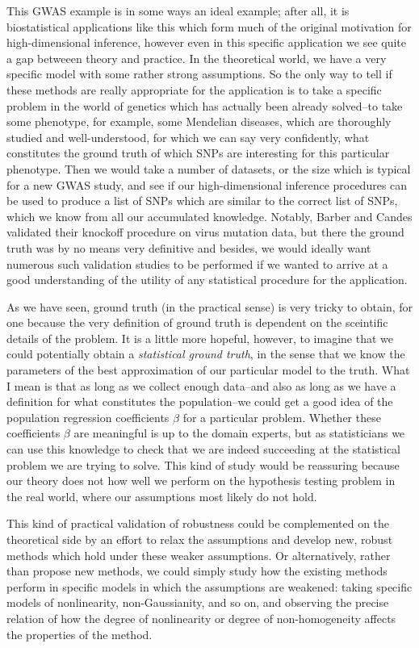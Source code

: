 \documentclass[11pt]{article}
\begin{document}
This GWAS example is in some ways an ideal example; after all, it is
biostatistical applications like this which form much of the original
motivation for high-dimensional inference, however even in this
specific application we see quite a gap betweeen theory and practice.
In the theoretical world, we have a very specific model with some
rather strong assumptions.  So the only way to tell if these methods
are really appropriate for the application is to take a specific
problem in the world of genetics which has actually been already
solved--to take some phenotype, for example, some Mendelian diseases,
which are thoroughly studied and well-understood, for which we can say
very confidently, what constitutes the ground truth of which SNPs are
interesting for this particular phenotype.  Then we would take a
number of datasets, or the size which is typical for a new GWAS study,
and see if our high-dimensional inference procedures can be used to
produce a list of SNPs which are similar to the correct list of SNPs,
which we know from all our accumulated knowledge.  Notably, Barber and
Candes validated their knockoff procedure on virus mutation data, but
there the ground truth was by no means very definitive and besides, we
would ideally want numerous such validation studies to be performed if
we wanted to arrive at a good understanding of the utility of any
statistical procedure for the application.

As we have seen, ground truth (in the practical sense) is very tricky
to obtain, for one because the very definition of ground truth is
dependent on the sceintific details of the problem.  It is a little
more hopeful, however, to imagine that we could potentially obtain a
\emph{statistical ground truth}, in the sense that we know the
parameters of the best approximation of our particular model to the
truth.  What I mean is that as long as we collect enough data--and
also as long as we have a definition for what constitutes the
population--we could get a good idea of the population regression
coefficients $\beta$ for a particular problem.  Whether these
coefficients $\beta$ are meaningful is up to the domain experts, but
as statisticians we can use this knowledge to check that we are indeed
succeeding at the statistical problem we are trying to solve.  This
kind of study would be reassuring because our theory does not how well
we perform on the hypothesis testing problem in the real world, where
our assumptions most likely do not hold.

This kind of practical validation of robustness could be complemented
on the theoretical side by an effort to relax the assumptions and
develop new, robust methods which hold under these weaker assumptions.
Or alternatively, rather than propose new methods, we could simply
study how the existing methods perform in specific models in which the
assumptions are weakened: taking specific models of nonlinearity,
non-Gaussianity, and so on, and observing the precise relation of how
the degree of nonlinearity or degree of non-homogeneity affects the
properties of the method.
\end{document}
